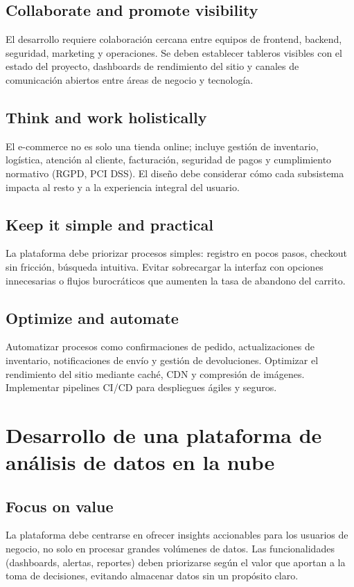 \documentclass{article}
\begin{document}
\subsection{Collaborate and promote visibility}
El desarrollo requiere colaboración cercana entre equipos de frontend, backend, seguridad, marketing y operaciones. Se deben establecer tableros visibles con el estado del proyecto, dashboards de rendimiento del sitio y canales de comunicación abiertos entre áreas de negocio y tecnología.

\subsection{Think and work holistically}
El e-commerce no es solo una tienda online; incluye gestión de inventario, logística, atención al cliente, facturación, seguridad de pagos y cumplimiento normativo (RGPD, PCI DSS). El diseño debe considerar cómo cada subsistema impacta al resto y a la experiencia integral del usuario.

\subsection{Keep it simple and practical}
La plataforma debe priorizar procesos simples: registro en pocos pasos, checkout sin fricción, búsqueda intuitiva. Evitar sobrecargar la interfaz con opciones innecesarias o flujos burocráticos que aumenten la tasa de abandono del carrito.

\subsection{Optimize and automate}
Automatizar procesos como confirmaciones de pedido, actualizaciones de inventario, notificaciones de envío y gestión de devoluciones. Optimizar el rendimiento del sitio mediante caché, CDN y compresión de imágenes. Implementar pipelines CI/CD para despliegues ágiles y seguros.

\section{Desarrollo de una plataforma de análisis de datos en la nube}

\subsection{Focus on value}
La plataforma debe centrarse en ofrecer insights accionables para los usuarios de negocio, no solo en procesar grandes volúmenes de datos. Las funcionalidades (dashboards, alertas, reportes) deben priorizarse según el valor que aportan a la toma de decisiones, evitando almacenar datos sin un propósito claro.
\end{document}
